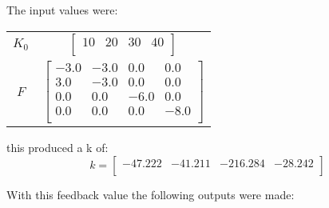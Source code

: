 The input values were: 
\begin{tabular}{c|c}
$K_0$ & $\begin{bmatrix}
10&20&30&40\\
\end{bmatrix}
 $ \\$F$ & $\begin{bmatrix}
-3.0&-3.0&0.0&0.0\\
3.0&-3.0&0.0&0.0\\
0.0&0.0&-6.0&0.0\\
0.0&0.0&0.0&-8.0\\
\end{bmatrix}
 $ \\\end{tabular}
this produced a k of: 
\begin{equation}
  k = \begin{bmatrix}
-47.222&-41.211&-216.284&-28.242\\
\end{bmatrix}
\end{equation}

With this feedback value the following outputs were made:

